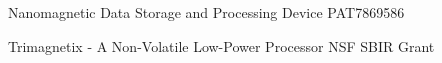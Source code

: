 




\begin{cvhonors}


\cvhonor
{Nanomagnetic Data Storage and Processing Device} %
{PAT7869586} %
{}
{}


\end{cvhonors}




\begin{cvhonors}


\cvhonor
{Trimagnetix - A Non-Volatile Low-Power Processor} %
{NSF SBIR Grant} %
{}
{}


\end{cvhonors}
